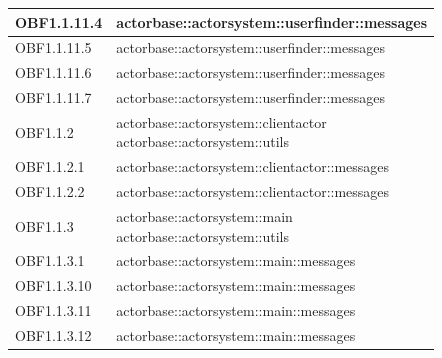 \documentclass{scalatekids-article}
\begin{document}
\begin{longtable}[H]{|p{6cm}|p{11cm}|}
\hline
OBF1.1.11.4 & \multiLineCell[t]{actorbase::actorsystem::userfinder::messages\\}\\
\hline
OBF1.1.11.5 & \multiLineCell[t]{actorbase::actorsystem::userfinder::messages\\}\\
\hline
OBF1.1.11.6 & \multiLineCell[t]{actorbase::actorsystem::userfinder::messages\\}\\
\hline
OBF1.1.11.7 & \multiLineCell[t]{actorbase::actorsystem::userfinder::messages\\}\\
\hline
OBF1.1.2 & \multiLineCell[t]{actorbase::actorsystem::clientactor\\actorbase::actorsystem::utils\\}\\
\hline
OBF1.1.2.1 & \multiLineCell[t]{actorbase::actorsystem::clientactor::messages\\}\\
\hline
OBF1.1.2.2 & \multiLineCell[t]{actorbase::actorsystem::clientactor::messages\\}\\
\hline
OBF1.1.3 & \multiLineCell[t]{actorbase::actorsystem::main\\actorbase::actorsystem::utils\\}\\
\hline
OBF1.1.3.1 & \multiLineCell[t]{actorbase::actorsystem::main::messages\\}\\
\hline
OBF1.1.3.10 & \multiLineCell[t]{actorbase::actorsystem::main::messages\\}\\
\hline
OBF1.1.3.11 & \multiLineCell[t]{actorbase::actorsystem::main::messages\\}\\
\hline
OBF1.1.3.12 & \multiLineCell[t]{actorbase::actorsystem::main::messages\\}\\

\end{longtable}
\end{document}
